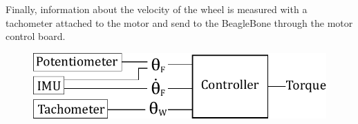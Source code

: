 Finally, information about the velocity of the wheel is measured with a tachometer attached to the motor and send to the BeagleBone through the motor control board. 
\\
\begin{figure}[H]\vspace{-4mm}
	\centering
	\includegraphics[scale=.75]{figures/measurements}
	\label{fig:measurements}
\end{figure}\vspace{-5mm}
